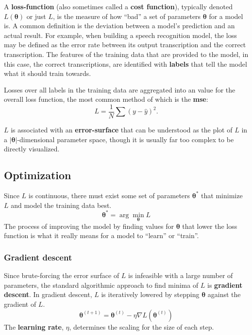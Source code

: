 \documentclass[12pt]{report}
\theoremstyle{definition}
\theoremstyle{remark}
\begin{document}
A \textbf{\gls{loss-function}} (also sometimes called a \textbf{cost function}), typically denoted $L(\boldsymbol{\theta})$ or just $L$, is the measure of how ``bad'' a set of parameters $\boldsymbol{\theta}$ for a model is. A common definition is the deviation between a model's prediction and an actual result. For example, when building a speech recognition model, the loss may be defined as the error rate between its output transcription and the correct transcription. The features of the training data that are provided to the model, in this case, the correct transcriptions, are identified with \textbf{\glspl{label}} that tell the model what it should train towards.

Losses over all labels in the training data are aggregated into an value for the overall loss function, the most common method of which is the \textbf{\gls{mse}}:
\begin{equation}
    L = \frac{1}{N}\sum (y - \hat{y})^2 .
\end{equation}

$L$ is associated with an \textbf{\gls{error-surface}} that can be understood as the plot of $L$ in a $|\boldsymbol{\theta}|$-dimensional parameter space, though it is usually far too complex to be directly visualized.

\subsection{Optimization}\label{sec:optimization}

Since $L$ is continuous, there must exist some set of parameters $\boldsymbol{\theta}^\ast$ that minimize $L$ and model the training data best.
\begin{equation}
    \boldsymbol{\theta}^\ast = \arg\min_{\boldsymbol{\theta}} L
\end{equation}
The process of improving the model by finding values for $\boldsymbol{\theta}$ that lower the loss function is what it really means for a model to ``learn'' or ``train''.

\subsubsection{Gradient descent}

Since brute-forcing the error surface of $L$ is infeasible with a large number of parameters, the standard algorithmic approach to find minima of $L$ is \textbf{gradient descent}. In gradient descent, $L$ is iteratively lowered by stepping $\boldsymbol{\theta}$ against the gradient of $L$.
\begin{equation}
    \boldsymbol{\theta}^{(t+1)} = \boldsymbol{\theta}^{(t)}-\eta\nabla L(\boldsymbol{\theta}^{(t)})
\end{equation}
The \textbf{learning rate}, $\eta$, determines the scaling for the size of each step.
\end{document}

